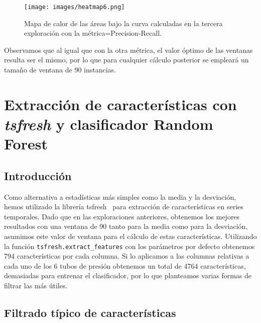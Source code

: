 \documentclass[a4paper,12pt,twoside,oldfontcommands]{memoir}
\begin{document}
\begin{figure}
    \centering
    \texttt{[image: images/heatmap6.png]}
    \caption{Mapa de calor de las áreas bajo la curva calculadas en la tercera exploración con la métrica=Precision-Recall.}
    \label{fig:heatmap6}
\end{figure}

Observamos que al igual que con la otra métrica, el valor óptimo de las ventanas resulta ser el mismo, por lo que para cualquier cálculo posterior se empleará un tamaño de ventana de 90 instancias. 

\chapter{Extracción de características con \textit{tsfresh} y clasificador Random Forest}
\section{Introducción}
Como alternativa a estadísticas más simples como la media y la desviación, hemos utilizado la librería tsfresh~\cite{christ2018time} para extracción de características en series temporales. Dado que en las exploraciones anteriores, obtenemos los mejores resultados con una ventana de 90 tanto para la media como para la desviación, asumimos este valor de ventana para el cálculo de estas características. Utilizando la función \texttt{tsfresh.extract\_features} con los parámetros por defecto obtenemos 794 características por cada columna. Si lo aplicamos a las columnas relativas a cada uno de los 6 tubos de presión obtenemos un total de 4764 características, demasiadas para entrenar el clasificador, por lo que planteamos varias formas de filtrar las más útiles. 

\section{Filtrado típico de características}
\end{document}

